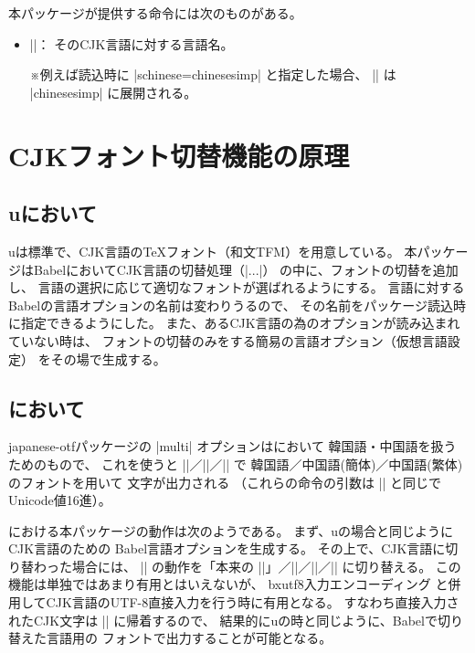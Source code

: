 \documentclass[a4paper,uplatex]{jsarticle}
\newcommand{\Pkg}[1]{\textsf{#1}}
\newcommand{\Meta}[1]{$\langle$\mbox{}#1\mbox{}$\rangle$}
\newcommand{\Note}{\par\noindent ※}
\newcommand{\Means}{：\quad\inhibitglue}
\providecommand{\upTeX}{u\pTeX}
\providecommand{\upLaTeX}{u\pLaTeX}
\begin{document}
本パッケージが提供する命令には次のものがある。

\begin{itemize}
\item |\cjklanguagename{|\Meta{CJK言語識別子}|}|\Means
そのCJK言語に対する言語名。
\Note 例えば読込時に |schinese=chinesesimp| と指定した場合、
|| は |chinesesimp| に展開される。
\end{itemize}

\section{CJKフォント切替機能の原理}

\subsection{{\upLaTeX}において}

{\upTeX}は標準で、CJK言語の{\TeX}フォント（和文TFM）を用意している。
本パッケージはBabelにおいてCJK言語の切替処理（|\extras...|）
の中に、フォントの切替を追加し、
言語の選択に応じて適切なフォントが選ばれるようにする。
言語に対するBabelの言語オプションの名前は変わりうるので、
その名前をパッケージ読込時に指定できるようにした。
また、あるCJK言語の為のオプションが読み込まれていない時は、
フォントの切替のみをする簡易の言語オプション（仮想言語設定）
をその場で生成する。

\subsection{{\pLaTeX}において}

\Pkg{japanese-otf}パッケージの |multi| オプションは{\pLaTeX}において
韓国語・中国語を扱うためのもので、
これを使うと |\UTFK|／|\UTFC|／|\UTFT| で
韓国語／中国語(簡体)／中国語(繁体)のフォントを用いて
文字が出力される
（これらの命令の引数は |\UTF| と同じでUnicode値16進）。

{\pLaTeX}における本パッケージの動作は次のようである。
まず、{\upLaTeX}の場合と同じようにCJK言語のための
Babel言語オプションを生成する。
その上で、CJK言語に切り替わった場合には、
|\UTF| の動作を「本来の |\UTF|」／|\UTFK|／|\UTFC|／|\UTFT|
に切り替える。
この機能は単独ではあまり有用とはいえないが、
\Pkg{bxutf8}入力エンコーディング
と併用してCJK言語のUTF-8直接入力を行う時に有用となる。
すなわち直接入力されたCJK文字は |\UTF| に帰着するので、
結果的に{\upLaTeX}の時と同じように、Babelで切り替えた言語用の
フォントで出力することが可能となる。
\end{document}

